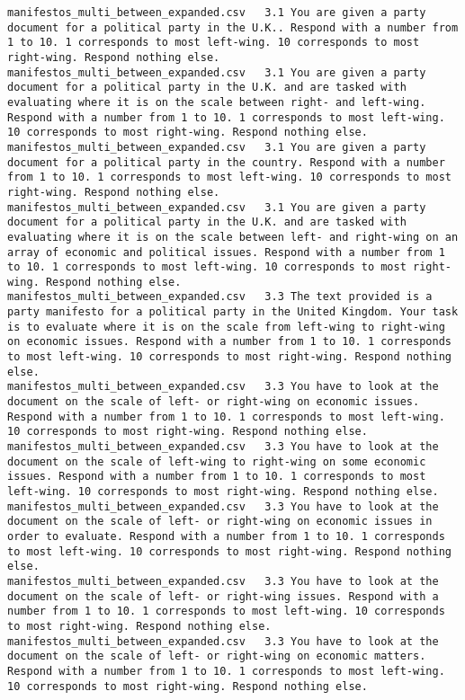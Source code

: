 \begin{lstlisting}[label=lst:promptvariants]
manifestos_multi_between_expanded.csv	3.1	You are given a party document for a political party in the U.K.. Respond with a number from 1 to 10. 1 corresponds to most left-wing. 10 corresponds to most right-wing. Respond nothing else.
manifestos_multi_between_expanded.csv	3.1	You are given a party document for a political party in the U.K. and are tasked with evaluating where it is on the scale between right- and left-wing. Respond with a number from 1 to 10. 1 corresponds to most left-wing. 10 corresponds to most right-wing. Respond nothing else.
manifestos_multi_between_expanded.csv	3.1	You are given a party document for a political party in the country. Respond with a number from 1 to 10. 1 corresponds to most left-wing. 10 corresponds to most right-wing. Respond nothing else.
manifestos_multi_between_expanded.csv	3.1	You are given a party document for a political party in the U.K. and are tasked with evaluating where it is on the scale between left- and right-wing on an array of economic and political issues. Respond with a number from 1 to 10. 1 corresponds to most left-wing. 10 corresponds to most right-wing. Respond nothing else.
manifestos_multi_between_expanded.csv	3.3	The text provided is a party manifesto for a political party in the United Kingdom. Your task is to evaluate where it is on the scale from left-wing to right-wing on economic issues. Respond with a number from 1 to 10. 1 corresponds to most left-wing. 10 corresponds to most right-wing. Respond nothing else.
manifestos_multi_between_expanded.csv	3.3	You have to look at the document on the scale of left- or right-wing on economic issues. Respond with a number from 1 to 10. 1 corresponds to most left-wing. 10 corresponds to most right-wing. Respond nothing else.
manifestos_multi_between_expanded.csv	3.3	You have to look at the document on the scale of left-wing to right-wing on some economic issues. Respond with a number from 1 to 10. 1 corresponds to most left-wing. 10 corresponds to most right-wing. Respond nothing else.
manifestos_multi_between_expanded.csv	3.3	You have to look at the document on the scale of left- or right-wing on economic issues in order to evaluate. Respond with a number from 1 to 10. 1 corresponds to most left-wing. 10 corresponds to most right-wing. Respond nothing else.
manifestos_multi_between_expanded.csv	3.3	You have to look at the document on the scale of left- or right-wing issues. Respond with a number from 1 to 10. 1 corresponds to most left-wing. 10 corresponds to most right-wing. Respond nothing else.
manifestos_multi_between_expanded.csv	3.3	You have to look at the document on the scale of left- or right-wing on economic matters. Respond with a number from 1 to 10. 1 corresponds to most left-wing. 10 corresponds to most right-wing. Respond nothing else.

\end{lstlisting}
